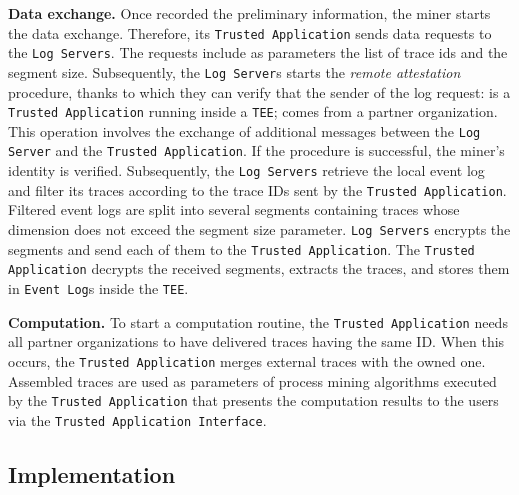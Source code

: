 \textbf{Data exchange.} Once recorded the preliminary information, the miner starts the data exchange. Therefore, its \texttt{Trusted Application} sends data requests to the \texttt{Log Servers}. The requests include as parameters the list of trace ids and the segment size. Subsequently, the \texttt{Log Server}s starts the \textit{remote attestation} procedure, thanks to which they can verify that the sender of the log request: is a \texttt{Trusted Application} running inside a \texttt{TEE}; comes from a partner organization. This operation involves the exchange of additional messages between the \texttt{Log Server} and the \texttt{Trusted Application}. If the procedure is successful, the miner's identity is verified.
Subsequently, the \texttt{Log Servers} retrieve the local event log and filter its traces according to the trace IDs sent by the \texttt{Trusted Application}. Filtered event logs are split into several segments containing traces whose dimension does not exceed the segment size parameter. \texttt{Log Servers} encrypts the segments and send each of them to the \texttt{Trusted Application}. The \texttt{Trusted Application} decrypts the received segments, extracts the traces, and stores them in \texttt{Event Log}s inside the \texttt{TEE}.

\textbf{Computation.} To start a computation routine, the \texttt{Trusted Application} needs all partner organizations to have delivered traces having the same ID. When this occurs, the \texttt{Trusted Application} merges external traces with the owned one. Assembled traces are used as parameters of process mining algorithms executed by the \texttt{Trusted Application} that presents the computation results to the users via the \texttt{Trusted Application Interface}.
\subsection{Implementation}
\label{sec:implementation:details}


